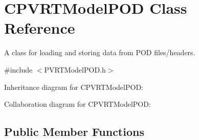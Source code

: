 \hypertarget{class_c_p_v_r_t_model_p_o_d}{\section{C\+P\+V\+R\+T\+Model\+P\+O\+D Class Reference}
\label{class_c_p_v_r_t_model_p_o_d}
}


A class for loading and storing data from P\+O\+D files/headers.  




{\ttfamily \#include $<$P\+V\+R\+T\+Model\+P\+O\+D.\+h$>$}



Inheritance diagram for C\+P\+V\+R\+T\+Model\+P\+O\+D\+:


Collaboration diagram for C\+P\+V\+R\+T\+Model\+P\+O\+D\+:
\subsection*{Public Member Functions}
